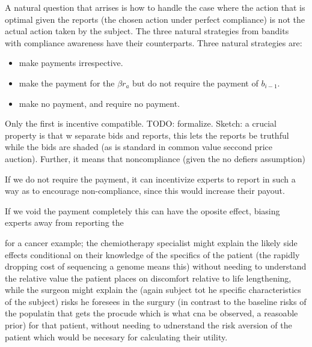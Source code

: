 A natural question that arrises is how to handle the case where the action that is optimal given the reports (the chosen action under perfect compliance) is not the actual action taken by the subject. The three natural strategies from bandits with compliance awareness have their counterparts. Three natural strategies are:

\begin{itemize}
\item make payments irrespective. 
\item make the payment for the $\beta r_a$ but do not require the payment of $b_{i-1}$.
\item make no payment, and require no payment.
\end{itemize}

Only the first is incentive compatible. TODO: formalize. Sketch: a crucial property is that w separate bids and reports, this lets the reports be truthful while the bids are shaded (as is standard in common value seccond price auction). Further, it means that noncompliance (given the no defiers assumption) 


If we do not require the payment, it can incentivize experts to report in such a way as to encourage non-compliance, since this would increase their payout. 


If we void the payment completely this can have the oposite effect, biasing experts away from reporting the 


for a cancer example; the chemiotherapy specialist might explain the likely side effects conditional on their knowledge of the specifics of the patient (the rapidly dropping cost of sequencing a genome means this) without needing to understand the relative value the patient places on discomfort relative to life lengthening, while the surgeon might explain the (again subject tot he specific characteristics of the subject) risks he foresees in the surgury (in contrast to the baseline risks of the populatin that gets the procude which is what cna be observed, a reasoable prior) for that patient, without needing to udnerstand the risk aversion of the patient which would be necesary for calculating their utility.

